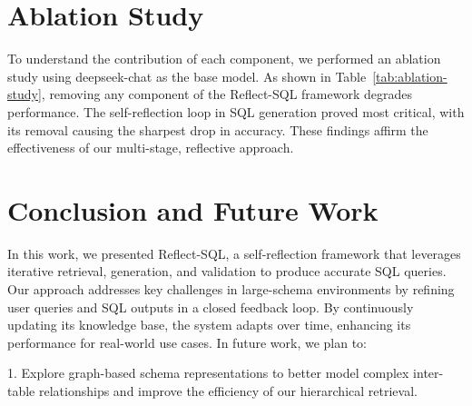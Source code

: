\documentclass[runningheads]{llncs}
\begin{document}
\section{Ablation Study}
To understand the contribution of each component, we performed an ablation study using deepseek-chat as the base model. As shown in Table~\ref{tab:ablation-study}, removing any component of the Reflect-SQL framework degrades performance. The self-reflection loop in SQL generation proved most critical, with its removal causing the sharpest drop in accuracy. These findings affirm the effectiveness of our multi-stage, reflective approach.

\begin{table}[ht]
\caption{Ablation results showing the contribution of each module.}\label{tab:ablation-study}
\centering
\footnotesize
{}
\end{table}

\section{Conclusion and Future Work}
In this work, we presented Reflect-SQL, a self-reflection framework that leverages iterative retrieval, generation, and validation to produce accurate SQL queries. Our approach addresses key challenges in large-schema environments by refining user queries and SQL outputs in a closed feedback loop. By continuously updating its knowledge base, the system adapts over time, enhancing its performance for real-world use cases.
In future work, we plan to:

1. Explore graph-based schema representations to better model complex inter-table relationships and improve the efficiency of our hierarchical retrieval.
\end{document}
